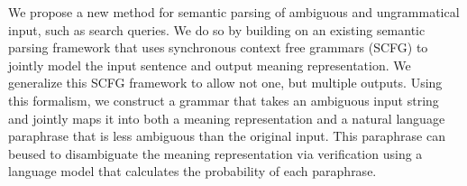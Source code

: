 We propose a new method for semantic parsing of ambiguous and ungrammatical input, such as search queries. We do so by building on an existing semantic parsing framework that uses synchronous context free grammars (SCFG) to jointly model the input sentence and output meaning representation. We generalize this SCFG framework to allow not one, but multiple outputs. Using this formalism, we construct a grammar that takes an ambiguous input string and jointly maps it into both a meaning representation and a natural language paraphrase that is less ambiguous than the original input. This paraphrase can beused to disambiguate the meaning representation via verification using a language model that calculates the probability of each paraphrase.